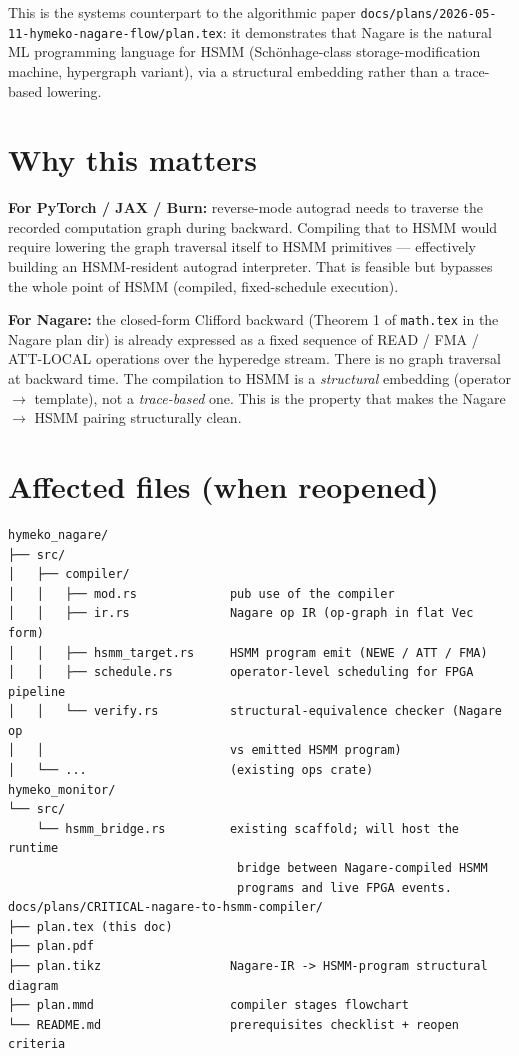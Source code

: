 \documentclass[11pt]{article}
\begin{document}
This is the systems counterpart to the algorithmic paper
\texttt{docs/plans/2026-05-11-hymeko-nagare-flow/plan.tex}: it
demonstrates that Nagare is the natural ML programming language for
HSMM (Schönhage-class storage-modification machine, hypergraph
variant), via a structural embedding rather than a trace-based
lowering.

\section{Why this matters}

\textbf{For PyTorch / JAX / Burn:} reverse-mode autograd needs to
traverse the recorded computation graph during backward. Compiling
that to HSMM would require lowering the graph traversal itself to
HSMM primitives --- effectively building an HSMM-resident autograd
interpreter. That is feasible but bypasses the whole point of
HSMM (compiled, fixed-schedule execution).

\textbf{For Nagare:} the closed-form Clifford backward (Theorem 1 of
\texttt{math.tex} in the Nagare plan dir) is already expressed as a
fixed sequence of READ / FMA / ATT-LOCAL operations over the
hyperedge stream. There is no graph traversal at backward time. The
compilation to HSMM is a \emph{structural} embedding (operator
$\to$ template), not a \emph{trace-based} one. This is the property
that makes the Nagare $\to$ HSMM pairing structurally clean.

\section{Affected files (when reopened)}

\begin{lstlisting}
hymeko_nagare/
├── src/
│   ├── compiler/
│   │   ├── mod.rs             pub use of the compiler
│   │   ├── ir.rs              Nagare op IR (op-graph in flat Vec form)
│   │   ├── hsmm_target.rs     HSMM program emit (NEWE / ATT / FMA)
│   │   ├── schedule.rs        operator-level scheduling for FPGA pipeline
│   │   └── verify.rs          structural-equivalence checker (Nagare op
│   │                          vs emitted HSMM program)
│   └── ...                    (existing ops crate)
hymeko_monitor/
└── src/
    └── hsmm_bridge.rs         existing scaffold; will host the runtime
                                bridge between Nagare-compiled HSMM
                                programs and live FPGA events.
docs/plans/CRITICAL-nagare-to-hsmm-compiler/
├── plan.tex (this doc)
├── plan.pdf
├── plan.tikz                  Nagare-IR -> HSMM-program structural diagram
├── plan.mmd                   compiler stages flowchart
└── README.md                  prerequisites checklist + reopen criteria
\end{lstlisting}
\end{document}
